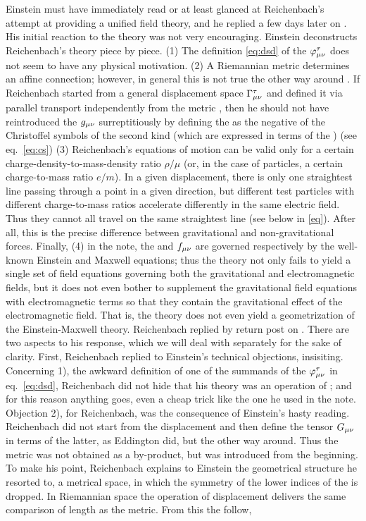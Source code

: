 \documentclass[draft]{article}
\begin{document}
Einstein must have immediately read or at least glanced at Reichenbach's attempt at providing a unified field theory, and he replied a few days later on . His initial reaction to the theory was not very encouraging. Einstein deconstructs Reichenbach's theory piece by piece. (1) The definition \eqref{eq:dsd} of the $\varphi^\tau_{\mu\nu}$ does not seem to have any physical motivation. (2) A Riemannian metric determines an affine connection; however, in general this is not true the other way around \citep[cf.\ e.g.,][9]{Einstein1923}. If Reichenbach started from a general displacement space $\Gamma^\tau_{\mu\nu}$ and defined it via parallel transport independently from the metric \gmn, then he should not have reintroduced the $g_{\mu\nu}$ surreptitiously by defining the \gtmn as the negative of the Christoffel symbols of the second kind (which are expressed in terms of the \gmn) (see eq.~\ref{eq:cs}) (3) Reichenbach's equations of motion can be valid only for a certain charge-density-to-mass-density ratio $\rho/\mu$ (or, in the case of particles, a certain charge-to-mass ratio $e/m$). In a given displacement, there is only one straightest line passing through a point in a given direction, but different test particles with different charge-to-mass ratios accelerate differently in the same electric field. Thus they cannot all travel on the same straightest line (see below in \cref{eq}). After all, this is the precise difference between gravitational and non-gravitational forces. Finally, (4) in the note, the \gmn and $f_{\mu\nu}$ are governed respectively by the well-known Einstein and Maxwell equations; thus the theory not only fails to yield a single set of field equations governing both the gravitational and electromagnetic fields, but it does not even bother to supplement the gravitational field equations with electromagnetic terms so that they contain the gravitational effect of the electromagnetic field. That is, the theory does not even yield a geometrization of the Einstein-Maxwell theory. Reichenbach replied by return post on . There are two aspects to his response, which we will deal with separately for the sake of clarity. First, Reichenbach replied to Einstein's technical objections, insisiting. Concerning 1), the awkward definition of one of the summands of the $\varphi^\tau_{\mu\nu}$ in eq.~\eqref{eq:dsd}, Reichenbach did not hide that his theory was an operation of ; and for this reason anything goes, even a cheap trick like the one he used in the note.  Objection 2), for Reichenbach, was the consequence of Einstein's hasty reading. Reichenbach did not start from the displacement and then define the tensor $G_{\mu\nu}$ in terms of the latter, as Eddington did, but the other way around. Thus the metric was not obtained as a by-product, but was introduced from the beginning. To make his point, Reichenbach explains to Einstein the geometrical structure he resorted to, a metrical space, in which the symmetry of the lower indices of the \Gtmn is dropped. In Riemannian space the operation of displacement delivers the same comparison of length as the metric. From this the  follow, 
\end{document}
